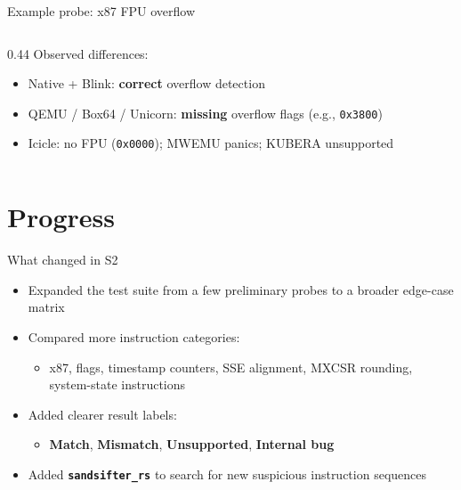 \documentclass{beamer}
\begin{document}
\begin{frame}{Example probe: x87 FPU overflow}
\begin{columns}[T,onlytextwidth]
\begin{column}{0.44\textwidth}
      \vspace{0.2em}
      Observed differences:
      \begin{itemize}
        \item Native + Blink: \textbf{correct} overflow detection
        \item QEMU / Box64 / Unicorn: \textbf{missing} overflow flags (e.g., \texttt{0x3800})
        \item Icicle: no FPU (\texttt{0x0000}); MWEMU panics; KUBERA unsupported
      \end{itemize}
    \end{column}
  \end{columns}
\end{frame}

\section{Progress}
\begin{frame}{What changed in S2}
  \begin{itemize}
    \item Expanded the test suite from a few preliminary probes to a broader edge-case matrix
    \item Compared more instruction categories:
      \begin{itemize}
        \item x87, flags, timestamp counters, SSE alignment, MXCSR rounding, system-state instructions
      \end{itemize}
    \item Added clearer result labels:
      \begin{itemize}
        \item \textbf{Match}, \textbf{Mismatch}, \textbf{Unsupported}, \textbf{Internal bug}
      \end{itemize}
    \item Added \textbf{\texttt{sandsifter\_rs}} to search for new suspicious instruction sequences
  \end{itemize}
\end{frame}
\end{document}
